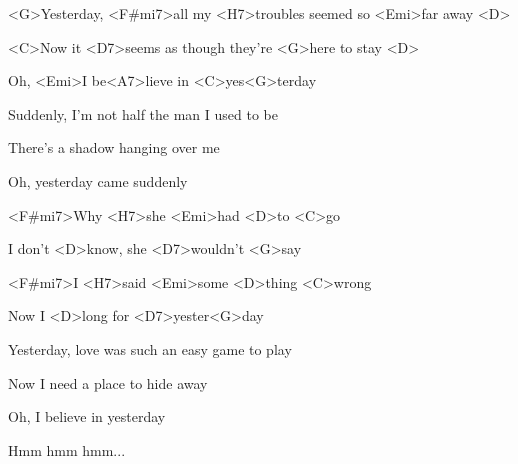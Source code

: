 

\zs
<G>Yesterday, <F#mi7>all my <H7>troubles seemed so <Emi>far away <D>

<C>Now it <D7>seems as though they're <G>here to stay <D>

Oh, <Emi>I be<A7>lieve in <C>yes<G>terday
\ks

\zs
Suddenly, I'm not half the man I used to be

There's a shadow hanging over me

Oh, yesterday came suddenly
\ks

\zr
<F#mi7>Why <H7>she <Emi>had <D>to <C>go

I don't <D>know, she <D7>wouldn't <G>say

<F#mi7>I <H7>said <Emi>some <D>thing <C>wrong

Now I <D>long for <D7>yester<G>day
\kr

\zs
Yesterday, love was such an easy game to play

Now I need a place to hide away

Oh, I believe in yesterday

Hmm hmm hmm...
\ks

\kp
